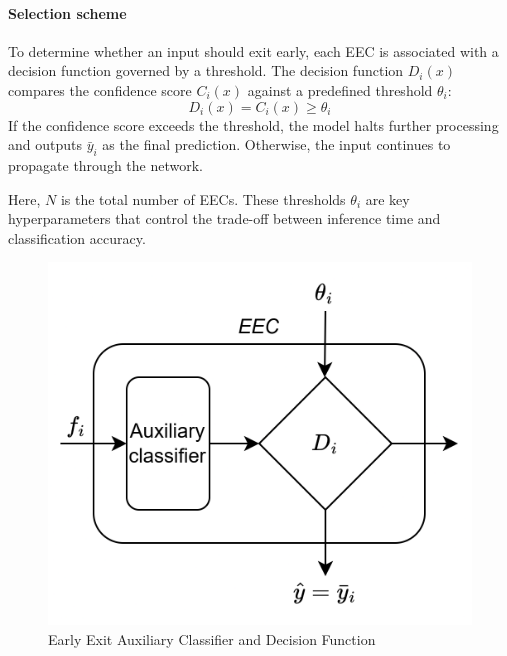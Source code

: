 \paragraph*{Selection scheme}
To determine whether an input should exit early, each EEC is associated with a decision function governed by a threshold.
The decision function $D_i(x)$ compares the confidence score $C_i (x)$  against a predefined threshold $\theta_i$: 
\[D_i(x) = C_i (x) \geq \theta_i\]
\noindent If the confidence score exceeds the threshold, the model halts further processing and outputs $\bar{y}_i$ as the final prediction.
Otherwise, the input continues to propagate through the network.

Here, $N$ is the total number of EECs. 
These thresholds $\theta_i$ are key hyperparameters that control the trade-off between inference time and classification accuracy.
\begin{figure}[H]
    \centering
    \includegraphics[width=0.4\linewidth]{images/eeai12.png}
    \caption{Early Exit Auxiliary Classifier and Decision Function}
\end{figure}